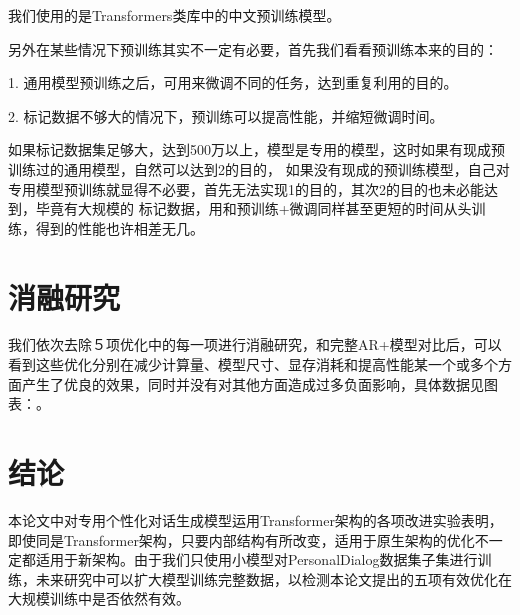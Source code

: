 \documentclass[letterpaper]{article} %
\DeclareRobustCommand{\citeext}[1]{\cite[#1]{#1}}
\begin{document}
\begin{CJK*}{UTF8}{gbsn}
我们使用的是Transformers类库\citeext{Wolf2019HuggingFacesTS}中的中文预训练模型。

另外在某些情况下预训练其实不一定有必要，首先我们看看预训练本来的目的：

1. 通用模型预训练之后，可用来微调不同的任务，达到重复利用的目的。

2. 标记数据不够大的情况下，预训练可以提高性能，并缩短微调时间。

如果标记数据集足够大，达到500万以上，模型是专用的模型，这时如果有现成预训练过的通用模型，自然可以达到2的目的，
如果没有现成的预训练模型，自己对专用模型预训练就显得不必要，首先无法实现1的目的，其次2的目的也未必能达到，毕竟有大规模的
标记数据，用和预训练+微调同样甚至更短的时间从头训练，得到的性能也许相差无几。


\section[Ablation Study]{消融研究} 
我们依次去除５项优化中的每一项进行消融研究，和完整AR+模型对比后，可以看到这些优化分别在减少计算量、模型尺寸、显存消耗和提高性能某一个或多个方面产生了优良的效果，同时并没有对其他方面造成过多负面影响，具体数据见图表：。

\section[Conclusion]{结论} 
本论文中对专用个性化对话生成模型运用Transformer架构的各项改进实验表明，即使同是Transformer架构，只要内部结构有所改变，适用于原生架构的优化不一定都适用于新架构。由于我们只使用小模型对PersonalDialog数据集子集进行训练，未来研究中可以扩大模型训练完整数据，以检测本论文提出的五项有效优化在大规模训练中是否依然有效。




\clearpage\end{CJK*}
\end{document}
